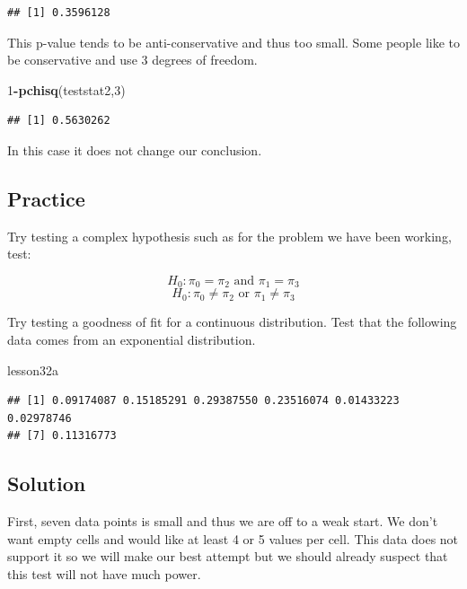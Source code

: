 \documentclass[]{book}
\newenvironment{Shaded}{\begin{snugshade}}{\end{snugshade}}
\newcommand{\KeywordTok}[1]{\textcolor[rgb]{0.13,0.29,0.53}{\textbf{#1}}}
\newcommand{\DecValTok}[1]{\textcolor[rgb]{0.00,0.00,0.81}{#1}}
\newcommand{\OperatorTok}[1]{\textcolor[rgb]{0.81,0.36,0.00}{\textbf{#1}}}
\newcommand{\NormalTok}[1]{#1}
\theoremstyle{definition}
\theoremstyle{definition}
\theoremstyle{definition}
\theoremstyle{remark}
\begin{document}
\begin{verbatim}
## [1] 0.3596128
\end{verbatim}

This p-value tends to be anti-conservative and thus too small. Some
people like to be conservative and use 3 degrees of freedom.

\begin{Shaded}
\begin{Highlighting}[]
\DecValTok{1}\OperatorTok{-}\KeywordTok{pchisq}\NormalTok{(teststat2,}\DecValTok{3}\NormalTok{)}
\end{Highlighting}
\end{Shaded}

\begin{verbatim}
## [1] 0.5630262
\end{verbatim}

In this case it does not change our conclusion.

\subsection{Practice}\label{practice-12}

Try testing a complex hypothesis such as for the problem we have been
working, test:

\[H_{0}: \pi_{0}=\pi_{2} \mbox{ and } \pi_{1}=\pi_{3}\]
\[H_{0}: \pi_{0}\neq \pi_{2} \mbox{ or } \pi_{1}\neq \pi_{3}\]

Try testing a goodness of fit for a continuous distribution. Test that
the following data comes from an exponential distribution.

\begin{Shaded}
\begin{Highlighting}[]
\NormalTok{lesson32a}
\end{Highlighting}
\end{Shaded}

\begin{verbatim}
## [1] 0.09174087 0.15185291 0.29387550 0.23516074 0.01433223 0.02978746
## [7] 0.11316773
\end{verbatim}

\subsection{Solution}\label{solution}

First, seven data points is small and thus we are off to a weak start.
We don't want empty cells and would like at least 4 or 5 values per
cell. This data does not support it so we will make our best attempt but
we should already suspect that this test will not have much power.
\end{document}

